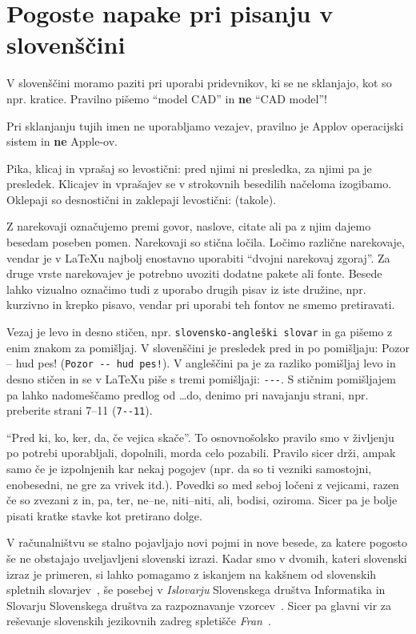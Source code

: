 \documentclass[a4paper,12pt,openright]{book}
\begin{document}
\chapter{Pogoste napake pri pisanju v slovenščini}  %
\label{slo}

V slovenščini moramo paziti  pri uporabi pridevnikov, ki se ne sklanjajo, kot so npr. kratice.
Pravilno pišemo ``model CAD'' in \textbf{ne} ``CAD model''!

Pri sklanjanju tujih imen ne uporabljamo vezajev, pravilno je Applov operacijski sistem in \textbf{ne} Apple-ov.

Pika, klicaj in vprašaj so levostični: pred njimi ni presledka, za njimi pa je presledek.
Klicajev in vprašajev se v strokovnih besedilih načeloma izogibamo. Oklepaji so desnostični in zaklepaji levostični: (takole).

Z narekovaji označujemo premi govor, naslove, citate ali pa z njim dajemo besedam poseben pomen. Narekovaji so stična ločila. Ločimo različne narekovaje, vendar je v
\LaTeX u najbolj enostavno uporabiti ``dvojni narekovaj zgoraj''. Za druge vrste narekovajev je potrebno uvoziti dodatne pakete ali fonte.
Besede lahko vizualno označimo tudi z uporabo drugih pisav  iz iste družine, npr.
kurzivno in krepko pisavo, vendar pri uporabi teh fontov ne smemo pretiravati.

Vezaj  je levo in desno stičen, npr. \verb=slovensko-angleški slovar= in ga pišemo z enim znakom za pomišljaj.
V slovenščini je presledek pred in po pomišljaju: Pozor -- hud pes! (\verb=Pozor -- hud pes!=).
V angleščini pa je za razliko pomišljaj levo in desno stičen in se v \LaTeX u piše s tremi  pomišljaji: \verb=---=.
S stičnim pomišljajem pa lahko nadomeščamo predlog od \dots do, denimo pri navajanju strani, npr. preberite strani 7--11 (\verb=7--11=).

``Pred ki, ko, ker, da, če vejica skače''.
To osnovnošolsko pravilo smo v življenju po potrebi uporabljali, dopolnili, morda celo pozabili.
Pravilo sicer drži, ampak samo če je izpolnjenih kar nekaj pogojev (npr. da so ti vezniki samostojni, enobesedni, ne gre za vrivek itd.).
Povedki so med seboj ločeni z vejicami, razen če so zvezani z in, pa, ter, ne–ne, niti–niti, ali, bodisi, oziroma.
Sicer pa je bolje pisati kratke stavke kot pretirano dolge.

V računalništvu se stalno pojavljajo novi pojmi in nove besede, za katere pogosto še ne obstajajo uveljavljeni slovenski izrazi.
Kadar smo v dvomih, kateri slovenski izraz je primeren, si lahko pomagamo z iskanjem na kakšnem od slovenskih spletnih slovarjev~\cite{slovarji}, še posebej v
\textit{Islovarju} Slovenskega društva Informatika \cite{Islovar} in Slovarju Slovenskega društva za razpoznavanje vzorcev~\cite{sdrv}.
Sicer pa glavni vir za reševanje slovenskih jezikovnih zadreg spletišče \textit{Fran}~\cite{fran}.
\end{document}
